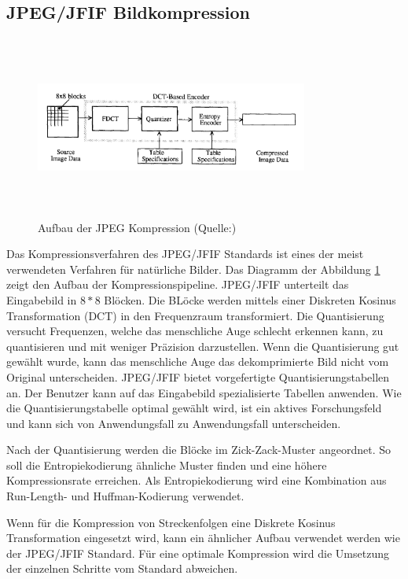 \subsection{JPEG/JFIF Bildkompression}
\begin{figure}[!htbp]
	\center
	\includegraphics[width=0.8\textwidth,height=6cm,keepaspectratio]{./pictures/state/jpeg.png}
	\caption{Aufbau der JPEG Kompression (Quelle:\cite{wallace1992jpeg})}
	\label{state:jpeg:abb}
\end{figure}
Das Kompressionsverfahren des JPEG/JFIF Standards \cite{wallace1992jpeg} ist eines der meist verwendeten Verfahren für natürliche Bilder. Das Diagramm der Abbildung \ref{state:jpeg:abb} zeigt den Aufbau der Kompressionspipeline. JPEG/JFIF unterteilt das Eingabebild in $8*8$ Blöcken. Die BLöcke werden mittels einer Diskreten Kosinus Transformation (DCT) in den Frequenzraum transformiert. Die Quantisierung versucht Frequenzen, welche das menschliche Auge schlecht erkennen kann, zu quantisieren und mit weniger Präzision darzustellen. Wenn die Quantisierung gut gewählt wurde, kann das menschliche Auge das dekomprimierte Bild nicht vom Original unterscheiden. JPEG/JFIF bietet vorgefertigte Quantisierungstabellen an. Der Benutzer kann auf das Eingabebild spezialisierte Tabellen anwenden. Wie die Quantisierungstabelle optimal gewählt wird, ist ein aktives Forschungsfeld \cite{wu1993rate:jpeg} \cite{wang2001designing:jpeg} und kann sich von Anwendungsfall zu Anwendungsfall unterscheiden.

Nach der Quantisierung werden die Blöcke im Zick-Zack-Muster \cite{wallace1992jpeg} angeordnet. So soll die Entropiekodierung ähnliche Muster finden und eine höhere Kompressionsrate erreichen. Als Entropiekodierung wird eine Kombination aus Run-Length- \cite{wiki:rle} und Huffman-Kodierung \cite{huffman1952method} verwendet.

Wenn für die Kompression von Streckenfolgen eine Diskrete Kosinus Transformation eingesetzt wird, kann ein ähnlicher Aufbau verwendet werden wie der JPEG/JFIF Standard. Für eine optimale Kompression wird die Umsetzung der einzelnen Schritte vom Standard abweichen.


